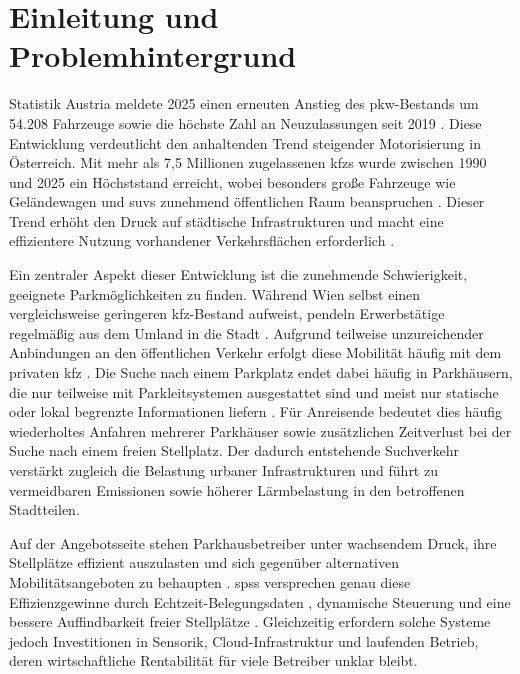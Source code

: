 \section{Einleitung und Problemhintergrund}

Statistik Austria meldete 2025 einen erneuten Anstieg des \ac{pkw}-Bestands um 54.208 Fahrzeuge \citep{statistikaustriaPkwBestand2025Um2026} sowie die höchste Zahl an Neuzulassungen seit 2019 \citep{statistikaustria2025VielePkwNeuzulassungen2026}.
Diese Entwicklung verdeutlicht den anhaltenden Trend steigender Motorisierung in Österreich.
Mit mehr als 7,5 Millionen zugelassenen \acp{kfz} wurde zwischen 1990 und 2025 ein Höchststand erreicht, wobei besonders große Fahrzeuge wie Geländewagen und \acp{suv} zunehmend öffentlichen Raum beanspruchen \citep{hatzlDatenZeigenImmer2025}.
Dieser Trend erhöht den Druck auf städtische Infrastrukturen und macht eine effizientere Nutzung vorhandener Verkehrsflächen erforderlich \citep{jaschinskyWarumOsterreichsStadte2025}.

Ein zentraler Aspekt dieser Entwicklung ist die zunehmende Schwierigkeit, geeignete Parkmöglichkeiten zu finden.
Während Wien selbst einen vergleichsweise geringeren \acs{kfz}-Bestand aufweist, pendeln Erwerbstätige regelmäßig aus dem Umland in die Stadt \citep{statistikaustriaKfzBestand2026}.
Aufgrund teilweise unzureichender Anbindungen an den öffentlichen Verkehr erfolgt diese Mobilität häufig mit dem privaten \acs{kfz} \citep{aknoAKNiederosterreichPendleranalyse20252025}.
Die Suche nach einem Parkplatz endet dabei häufig in Parkhäusern, die nur teilweise mit Parkleitsystemen ausgestattet sind und meist nur statische oder lokal begrenzte Informationen liefern \citep{stadtwienParkleitsystemFuerWien2026}. Für Anreisende bedeutet dies häufig wiederholtes Anfahren mehrerer Parkhäuser sowie zusätzlichen Zeitverlust bei der Suche nach einem freien Stellplatz.
Der dadurch entstehende Suchverkehr verstärkt zugleich die Belastung urbaner Infrastrukturen und führt zu vermeidbaren Emissionen sowie höherer Lärmbelastung in den betroffenen Stadtteilen.

Auf der Angebotsseite stehen Parkhausbetreiber unter wachsendem Druck, ihre Stellplätze effizient auszulasten und sich gegenüber alternativen Mobilitätsangeboten zu behaupten \citep{wangEconomicsSmartParking2025}. \acp{sps} versprechen genau diese Effizienzgewinne durch Echtzeit-Belegungsdaten \citep{alaanzyRealTimeSmart2025}, dynamische Steuerung und eine bessere Auffindbarkeit freier Stellplätze \citep{sarkerSmartParkingSystem2020}. Gleichzeitig erfordern solche Systeme jedoch Investitionen in Sensorik, Cloud-Infrastruktur und laufenden Betrieb, deren wirtschaftliche Rentabilität für viele Betreiber unklar bleibt.

